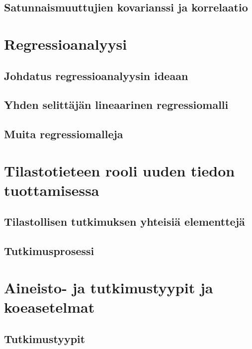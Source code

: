 \documentclass[
]{book}
\begin{document}
\hypertarget{alaluku74}{%
\section{Satunnaismuuttujien kovarianssi ja korrelaatio}\label{alaluku74}}

\hypertarget{luku8}{%
\chapter{Regressioanalyysi}\label{luku8}}

\hypertarget{alaluku81}{%
\section{Johdatus regressioanalyysin ideaan}\label{alaluku81}}

\hypertarget{alaluku82}{%
\section{Yhden selittäjän lineaarinen regressiomalli}\label{alaluku82}}

\hypertarget{alaluku83}{%
\section{Muita regressiomalleja}\label{alaluku83}}

\hypertarget{luku9}{%
\chapter{Tilastotieteen rooli uuden tiedon tuottamisessa}\label{luku9}}

\hypertarget{alaluku91}{%
\section{Tilastollisen tutkimuksen yhteisiä elementtejä}\label{alaluku91}}

\hypertarget{alaluku92}{%
\section{Tutkimusprosessi}\label{alaluku92}}

\hypertarget{luku10}{%
\chapter{Aineisto- ja tutkimustyypit ja koeasetelmat}\label{luku10}}

\hypertarget{alaluku101}{%
\section{Tutkimustyypit}\label{alaluku101}}
\end{document}

